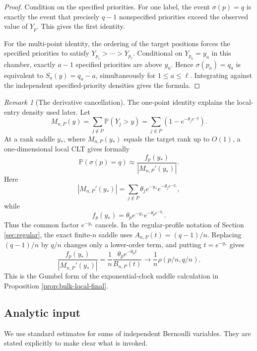 \documentclass[11pt]{article}
\theoremstyle{remark}
\newtheorem{remark}[theorem]{Remark}
\newcommand{\Pp}{\mathbb P}
\begin{document}
\begin{proof}
Condition on the specified priorities.  For one label, the event
\(\sigma(p)=q\) is exactly the event that precisely \(q-1\) nonspecified
priorities exceed the observed value of \(Y_p\).  This gives the first
identity.

For the multi-point identity, the ordering of the target positions forces the
specified priorities to satisfy \(Y_{p_1}>\cdots>Y_{p_\ell}\).  Conditional on
\(Y_{p_a}=y_a\) in this chamber, exactly \(a-1\) specified priorities are above
\(y_a\).  Hence \(\sigma(p_a)=q_a\) is equivalent to
\(S_a(y)=q_a-a\), simultaneously for \(1\le a\le\ell\).  Integrating against the
independent specified-priority densities gives the formula.
\end{proof}

\begin{remark}[The derivative cancellation]\label{rem:gumbel-derivative-cancellation}
The one-point identity explains the local-entry density used later.  Let
\[
        M_{n,P}(y)=\sum_{j\notin P}\Pp(Y_j>y)
        =\sum_{j\notin P}(1-e^{-\theta_j e^{-y}}).
\]
At a rank saddle \(y_*\), where \(M_{n,P}(y_*)\) equals the target rank up to
\(O(1)\), a one-dimensional local CLT gives formally
\[
        \Pp(\sigma(p)=q)
        \approx
        \frac{f_p(y_*)}{|M_{n,P}'(y_*)|}.
\]
Here
\[
        |M_{n,P}'(y_*)|
        =\sum_{j\notin P}\theta_j e^{-y_*}e^{-\theta_j e^{-y_*}},
\]
while
\[
        f_p(y_*)=\theta_p e^{-y_*}e^{-\theta_p e^{-y_*}}.
\]
Thus the common factor \(e^{-y_*}\) cancels.  In the regular-profile notation of
Section \ref{sec:regular}, the exact finite-$n$ saddle uses
$A_{n,P}(t)=(q-1)/n$.  Replacing $(q-1)/n$ by $q/n$ changes only a lower-order
term, and putting \(t=e^{-y_*}\) gives
\[
        \frac{f_p(y_*)}{|M_{n,P}'(y_*)|}
        =\frac1n\frac{\theta_p e^{-\theta_p t}}{B_{n,P}(t)}
        \longrightarrow
        \frac1n\rho(p/n,q/n).
\]
This is the Gumbel form of the exponential-clock saddle calculation in
Proposition \ref{prop:bulk-local-final}.
\end{remark}


\subsection{Analytic input}
We use standard estimates for sums of independent Bernoulli variables.  They are stated explicitly to make clear what is invoked.
\end{document}
